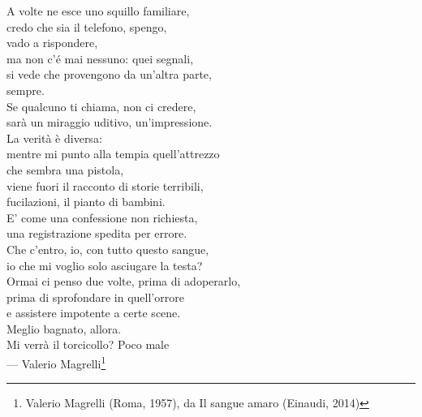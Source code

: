 \begin{flushright}
A volte ne esce uno squillo familiare, \\
credo che sia il telefono, spengo, \\
vado a rispondere, \\
ma non c’é mai nessuno: quei segnali, \\
si vede che provengono da un’altra parte, \\
sempre. \\
Se qualcuno ti chiama, non ci credere,\\
sarà un miraggio uditivo, un’impressione. \\
La verità è diversa: \\
mentre mi punto alla tempia quell’attrezzo \\
che sembra una pistola, \\
viene fuori il racconto di storie terribili, \\
fucilazioni, il pianto di bambini. \\
E’ come una confessione non richiesta, \\
una registrazione spedita per errore. \\
Che c’entro, io, con tutto questo sangue, \\
io che mi voglio solo asciugare la testa? \\
Ormai ci penso due volte, prima di adoperarlo, \\
prima di sprofondare in quell’orrore \\
e assistere impotente a certe scene. \\
Meglio bagnato, allora. \\
Mi verrà il torcicollo? Poco male \\ \medskip
--- Valerio Magrelli\footnote{Valerio Magrelli (Roma, 1957),  da Il sangue amaro (Einaudi, 2014)}    

\end{flushright}